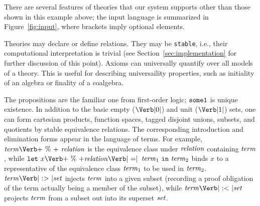 There are several features of theories that our system supports other
than those shown in this example above; the input language is
summarized in Figure~\ref{fig:input}, where brackets imply optional
elements.


Theories may declare or define relations.  They may be \Verb|stable|,
i.e., their computational interpretation is trivial (see
Section~\ref{sec:implementation} for further discussion of this point).
Axioms can universally quantify over all models of a theory.
  This is useful for describing universaility properties, such as
  initiality of an algebra or finality of a coalgebra.
  
  The propositions are the familiar one from first-order logic;
  $\mbox{\texttt{some1}}$ is unique existence. In addition to the basic empty
  ($\ZERO$) and unit ($\ONE$) sets, one can form cartesian products,
  function spaces, tagged disjoint unions, subsets, and quotients by
  stable equivalence relations. The corresponding introduction and
  elimination forms appear in the language of terms. For example,
  $\Term\PERCENT\ \metav{relation}$ is the equivalence class under
  $\mbox{\textit{relation}}$ containing $\mbox{\textit{term}}$, while $\LET\ x \PERCENT
  \metav{relation} \mbox{\Verb| =|}$ $ \mbox{\textit{term}}_1\ \mbox{\texttt{in}}\ \mbox{\textit{term}}_2$ binds
  $x$ to a representative of the equivalence class $\mbox{\textit{term}}_1$ to be
  used in $\mbox{\textit{term}}_2$. $\Term \SUBIN \Set$ injects $\mbox{\textit{term}}$ into a given
  subset (recording a proof obligation of the term actually being a
  member of the subset), while $\Term \SUBOUT \Set$ projects $\mbox{\textit{term}}$
  from a subset out into its superset $\mbox{\textit{set}}$.

